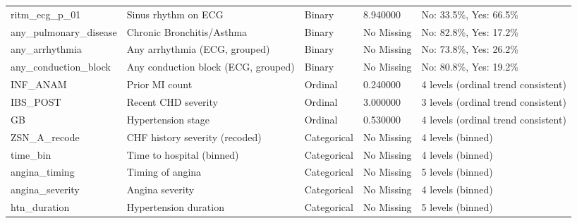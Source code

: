 \begin{longtable}{lllll}
ritm\_ecg\_p\_01 & Sinus rhythm on ECG & Binary & 8.940000 & No: 33.5\%, Yes: 66.5\% \\
any\_pulmonary\_disease & Chronic Bronchitis/Asthma & Binary & No Missing & No: 82.8\%, Yes: 17.2\% \\
any\_arrhythmia & Any arrhythmia (ECG, grouped) & Binary & No Missing & No: 73.8\%, Yes: 26.2\% \\
any\_conduction\_block & Any conduction block (ECG, grouped) & Binary & No Missing & No: 80.8\%, Yes: 19.2\% \\
INF\_ANAM & Prior MI count & Ordinal & 0.240000 & 4 levels (ordinal trend consistent) \\
IBS\_POST & Recent CHD severity & Ordinal & 3.000000 & 3 levels (ordinal trend consistent) \\
GB & Hypertension stage & Ordinal & 0.530000 & 4 levels (ordinal trend consistent) \\
ZSN\_A\_recode & CHF history severity (recoded) & Categorical & No Missing & 4 levels (binned) \\
time\_bin & Time to hospital (binned) & Categorical & No Missing & 4 levels (binned) \\
angina\_timing & Timing of angina & Categorical & No Missing & 5 levels (binned) \\
angina\_severity & Angina severity & Categorical & No Missing & 4 levels (binned) \\
htn\_duration & Hypertension duration & Categorical & No Missing & 5 levels (binned) \\
\end{longtable}
